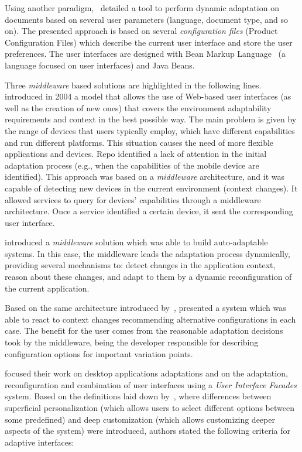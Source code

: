Using another paradigm,~\citet{lehtonen_dynamic_2002} detailed a tool to perform
dynamic adaptation on documents based on several user parameters (language,
document type, and so on). The presented approach is based on several \textit{configuration
files} (Product Configuration Files) which describe the current user interface and
store the user preferences. The user interfaces are designed with Bean Markup
Language~\citep{weerawarana_bean_2001} (a language focused on user interfaces)
and Java Beans.

Three \textit{middleware} based solutions are highlighted in the following lines.
\citet{repo_facilitating_2004} introduced in 2004 a model that allows the use 
of Web-based user interfaces (as well as the creation of new ones) that covers 
the environment adaptability requirements and context in the best possible way. 
The main problem is given by the range of devices that users typically employ, 
which have different capabilities and run different platforms. This situation 
causes the need of more flexible applications and devices. Repo identified a lack 
of attention in the initial adaptation process (e.g., when the capabilities of the
mobile device are identified). This approach was based on a \textit{middleware}
architecture, and it was capable of detecting new devices in the current environment
(context changes). It allowed services to query for devices' capabilities through 
a middleware architecture. Once a service identified a certain device, it sent 
the corresponding user interface. 

\citet{nilsson_model_based_2006} introduced a \textit{middleware} solution
which was able to build auto-adaptable systems. In this case, the middleware 
leads the adaptation process dynamically, providing several mechanisms to: 
detect changes in the application context, reason about these changes, and adapt 
to them by a dynamic reconfiguration of the current application. 

Based on the same architecture introduced by~\citet{nilsson_model_based_2006},
\citet{hallsteinsen_self_adaptation_2004} presented a system which was able to 
react to context changes recommending alternative configurations in each case.
The benefit for the user comes from the reasonable adaptation decisions took 
by the middleware, being the developer responsible for describing configuration 
options for important variation points.

\citet{stuerzlinger_user_2006} focused their work on desktop applications
adaptations and on the adaptation, reconfiguration and combination of user
interfaces using a \textit{User Interface Facades} system. Based on the definitions
laid down by~\citet{marmolin_medium_1995}, where differences between superficial
personalization (which allows users to select different options between some
predefined) and deep customization (which allows customizing deeper aspects of
the system) were introduced, authors stated the following criteria for adaptive
interfaces:

